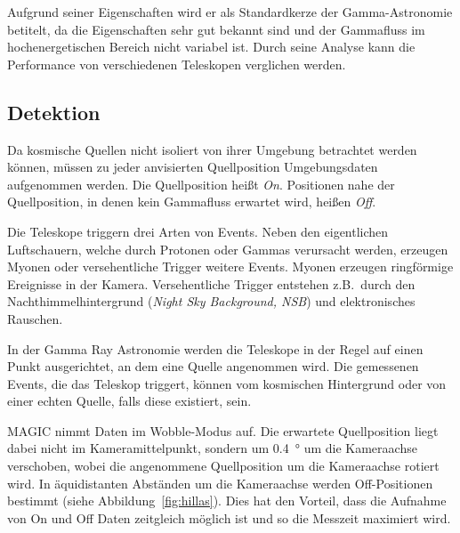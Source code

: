 Aufgrund seiner Eigenschaften wird er als Standardkerze der Gamma-Astronomie betitelt,
da die Eigenschaften sehr gut bekannt sind
und der Gammafluss im hochenergetischen Bereich nicht variabel ist.
Durch seine Analyse kann die Performance von verschiedenen Teleskopen verglichen werden.

\subsection*{Detektion}%
\label{sub:wobbelmodus}

Da kosmische Quellen nicht isoliert von ihrer Umgebung betrachtet
werden können,
müssen zu jeder anvisierten Quellposition Umgebungsdaten aufgenommen werden.
Die
Quellposition heißt \textit{On}.
Positionen nahe der Quellposition,
in denen kein Gammafluss erwartet wird,
heißen \textit{Off}.

Die Teleskope triggern drei Arten von Events.
Neben den eigentlichen Luftschauern,
welche durch Protonen
oder Gammas verursacht werden,
erzeugen Myonen oder versehentliche Trigger weitere Events.
Myonen erzeugen ringförmige Ereignisse in der Kamera.
Versehentliche Trigger entstehen z.B.\ durch den Nachthimmelhintergrund
(\textit{Night Sky Background, NSB}) und elektronisches Rauschen.

In der Gamma Ray Astronomie werden die Teleskope in der Regel auf einen Punkt
ausgerichtet, an dem eine Quelle angenommen wird.
Die gemessenen Events, die das Teleskop triggert, können vom
kosmischen Hintergrund oder von einer echten Quelle, falls diese existiert, sein.

MAGIC nimmt Daten im Wobble-Modus auf.
Die erwartete Quellposition liegt dabei nicht im
Kameramittelpunkt,
sondern um
\SI{0.4}{\degree} um die Kameraachse
verschoben,
wobei die angenommene Quellposition um die Kameraachse rotiert wird.
In äquidistanten Abständen um die Kameraachse
werden Off-Positionen bestimmt (siehe Abbildung~\ref{fig:hillas}).
Dies hat den Vorteil, dass die Aufnahme von On und Off Daten zeitgleich möglich
ist und so die Messzeit maximiert wird.


\clearpage
